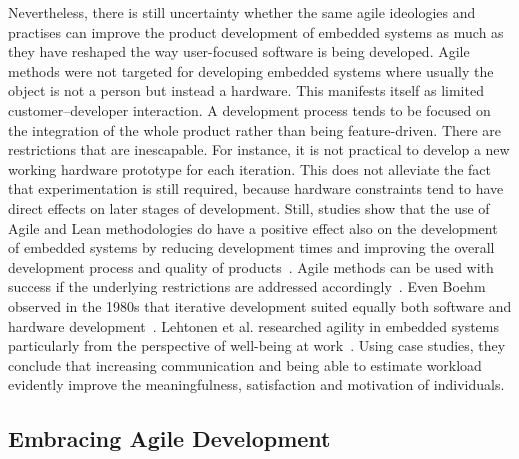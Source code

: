 \documentclass[english]{tktltiki2}
\begin{document}
Nevertheless, there is still uncertainty whether the same agile ideologies and practises can improve the product development of embedded systems as much as they have reshaped the way user-focused software is being developed. Agile methods were not targeted for developing embedded systems where usually the object is not a person but instead a hardware. This manifests itself as limited customer–developer interaction. A development process tends to be focused on the integration of the whole product rather than being feature-driven. There are restrictions that are inescapable. For instance, it is not practical to develop a new working hardware prototype for each iteration. This does not alleviate the fact that experimentation is still required, because hardware constraints tend to have direct effects on later stages of development. Still, studies show that the use of Agile and Lean methodologies do have a positive effect also on the development of embedded systems by reducing development times and improving the overall development process and quality of products~\cite{CWR10, KRM13}. Agile methods can be used with success if the underlying restrictions are addressed accordingly~\cite{RA03}. Even Boehm observed in the 1980s that iterative development suited equally both software and hardware development~\cite{Boe88}. Lehtonen et al. researched agility in embedded systems particularly from the perspective of well-being at work~\cite{LTR14}. Using case studies, they conclude that increasing communication and being able to estimate workload evidently improve the meaningfulness, satisfaction and motivation of individuals.

\subsection{Embracing Agile Development}
\end{document}
